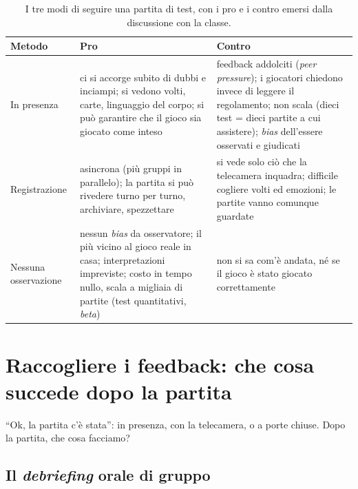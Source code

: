 \begin{table}[htbp]
\centering
\small
\begin{tabular}{@{}p{2.6cm}p{5.0cm}p{5.4cm}@{}}
\toprule
\textbf{Metodo} & \textbf{Pro} & \textbf{Contro} \\
\midrule
In presenza & ci si accorge subito di dubbi e inciampi; si vedono volti, carte,
linguaggio del corpo; si può garantire che il gioco sia giocato come inteso & feedback
addolciti (\emph{peer pressure}); i giocatori chiedono invece di leggere il
regolamento; non scala (dieci test = dieci partite a cui assistere); \emph{bias}
dell'essere osservati e giudicati \\
\addlinespace
Registrazione & asincrona (più gruppi in parallelo); la partita si può rivedere turno
per turno, archiviare, spezzettare & si vede solo ciò che la telecamera inquadra;
difficile cogliere volti ed emozioni; le partite vanno comunque guardate \\
\addlinespace
Nessuna osservazione & nessun \emph{bias} da osservatore; il più vicino al gioco reale
in casa; interpretazioni impreviste; costo in tempo nullo, scala a migliaia di
partite (test quantitativi, \emph{beta}) & non si sa com'è andata, né se il gioco è stato
giocato correttamente \\
\bottomrule
\end{tabular}
\caption{I tre modi di seguire una partita di test, con i pro e i contro emersi dalla
discussione con la classe.}
\label{a12:tab:durante}
\end{table}

\section{Raccogliere i feedback: che cosa succede dopo la partita}
\label{a12:sec:dopo}



``Ok, la partita c'è stata'': in presenza, con la telecamera, o a porte chiuse. Dopo la
partita, che cosa facciamo?

\subsection{Il \emph{debriefing} orale di gruppo}

